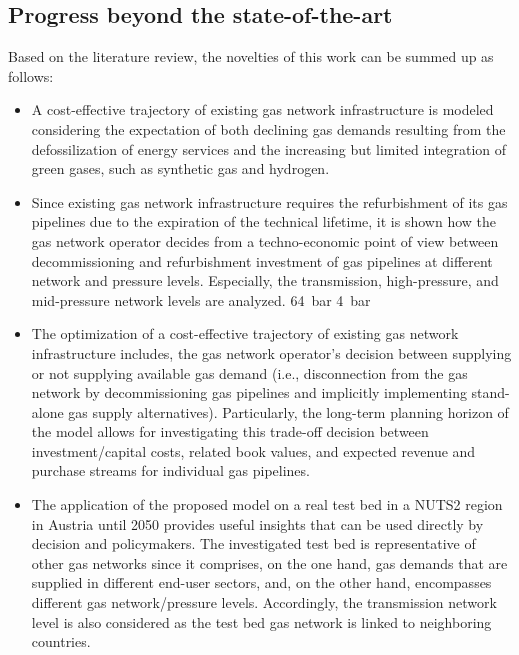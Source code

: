 \subsection{Progress beyond the state-of-the-art}\label{state:3}
Based on the literature review, the novelties of this work can be summed up as follows:
\begin{itemize}
	\item A cost-effective trajectory of existing gas network infrastructure is modeled considering the expectation of both declining gas demands resulting from the defossilization of energy services and the increasing but limited integration of green gases, such as synthetic gas and hydrogen.  
	\item Since existing gas network infrastructure requires the refurbishment of its gas pipelines due to the expiration of the technical lifetime, it is shown how the gas network operator decides from a techno-economic point of view between decommissioning and refurbishment investment of gas pipelines at different network and pressure levels. Especially, the transmission, high-pressure, and mid-pressure network levels are analyzed.  \SI{64}{bar}  \SI{4}{bar} 
	\item The optimization of a cost-effective trajectory of existing gas network infrastructure includes, the gas network operator's decision between supplying or not supplying available gas demand (i.e., disconnection from the gas network by decommissioning gas pipelines and implicitly implementing stand-alone gas supply alternatives). Particularly, the long-term planning horizon of the model allows for investigating this trade-off decision between investment/capital costs, related book values, and expected revenue and purchase streams for individual gas pipelines.
	\item The application of the proposed model on a real test bed in a NUTS2 region in Austria until 2050 provides useful insights that can be used directly by decision and policymakers. The investigated test bed is representative of other gas networks since it comprises, on the one hand, gas demands that are supplied in different end-user sectors, and, on the other hand, encompasses different gas network/pressure levels. Accordingly, the transmission network level is also considered as the test bed gas network is linked to neighboring countries.  
\end{itemize}

